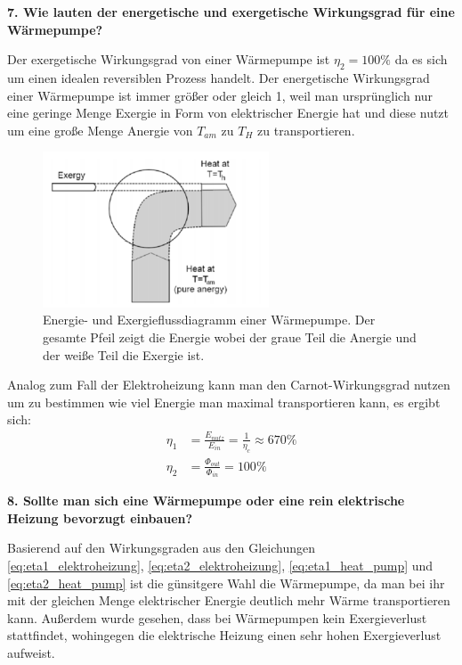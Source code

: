 \noindent\textbf{7. Wie lauten der energetische und exergetische Wirkungsgrad für eine Wärmepumpe?}\\
\begin{addmargin}[25pt]{0pt}     
Der exergetische Wirkungsgrad von einer Wärmepumpe ist $\eta_2 = 100\%$ da es sich um einen idealen reversiblen Prozess handelt. Der energetische Wirkungsgrad einer Wärmepumpe ist immer größer oder gleich 1, weil man ursprünglich nur eine geringe Menge Exergie in Form von elektrischer Energie hat und diese nutzt um eine große Menge Anergie von $T_{\si{am}}$ zu $T_{\si{H}}$ zu transportieren.\newpage
\begin{figure}[h]
    \centering
    \includegraphics[width = 0.6\textwidth]{images/Energiewissenschaften/Exergiefluss_heat_pump.png}
    \caption{Energie- und Exergieflussdiagramm einer Wärmepumpe. Der gesamte Pfeil zeigt die Energie wobei der graue Teil die Anergie und der weiße Teil die Exergie ist.}
    \label{fig:Exergiefluss_heat_pump}
\end{figure}
\noindent Analog zum Fall der Elektroheizung kann man den Carnot-Wirkungsgrad nutzen um zu bestimmen wie viel Energie man maximal transportieren kann, es ergibt sich:
\begin{align}\label{eq:eta1_heat_pump}
    \eta_1 &= \frac{E_{\si{nutz}}}{E_{\si{in}}} = \frac{1}{\eta_c} \approx 670\% \\ \label{eq:eta2_heat_pump}
    \eta_2 &= \frac{\Phi_{\si{out}}}{\Phi_{\si{in}}}= 100\%
\end{align}

\end{addmargin}

\noindent\textbf{8. Sollte man sich eine Wärmepumpe oder eine rein elektrische Heizung bevorzugt einbauen?}\\
\begin{addmargin}[25pt]{0pt}     
Basierend auf den Wirkungsgraden aus den Gleichungen \ref{eq:eta1_elektroheizung}, \ref{eq:eta2_elektroheizung}, \ref{eq:eta1_heat_pump} und \ref{eq:eta2_heat_pump} ist die günsitgere Wahl die Wärmepumpe, da man bei ihr mit der gleichen Menge elektrischer Energie deutlich mehr Wärme transportieren kann. Außerdem wurde gesehen, dass bei Wärmepumpen kein Exergieverlust stattfindet, wohingegen die elektrische Heizung einen sehr hohen Exergieverlust aufweist. \\
\end{addmargin}


